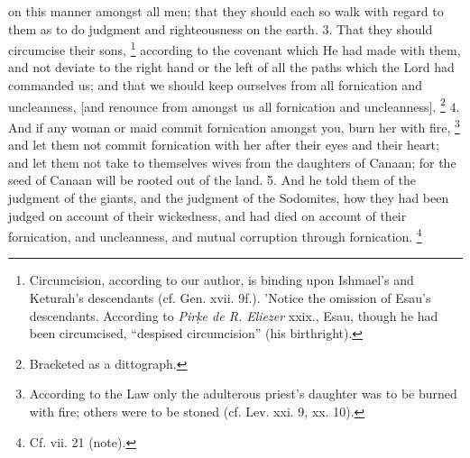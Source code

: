 on this manner amongst all men; that they should each so walk with regard to them as to do judgment and righteousness on the earth. 3. That they should circumcise their sons, \footnote{Circumcision, according to our author, is binding upon Ishmael's and Keturah's descendants (cf. Gen. xvii. 9f.). 'Notice the omission of Esau's descendants. According to \emph{Pir\d{k}e de R. Eliezer} xxix., Esau, though he had been circumcised, ``despised circumcision'' (his birthright).} according to the covenant which He had made with them, and not deviate to the right hand or the left of all the paths which the Lord had commanded us; and that we should keep ourselves from all fornication and uncleanness, [and renounce from amongst us all fornication and uncleanness]. \footnote{Bracketed as a dittograph.} 4. And if any woman or maid commit fornication amongst you, burn her with fire, \footnote{According to the Law only the adulterous priest's daughter was to be burned with fire; others were to be stoned (cf. Lev. xxi. 9, xx. 10).} and let them not commit fornication with her after their eyes and their heart; and let them not take to themselves wives from the daughters of Canaan; for the seed of Canaan will be rooted out of the land. 5. And he told them of the judgment of the giants, and the judgment of the Sodomites, how they had been judged on account of their wickedness, and had died on account of their fornication, and uncleanness, and mutual corruption through fornication. \footnote{Cf. vii. 21 (note).}

